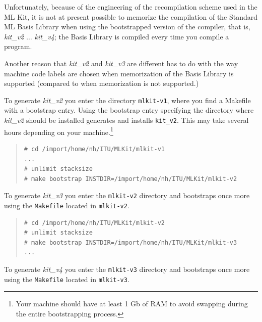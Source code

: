 \documentclass[12pt]{book}
\begin{document}
Unfortunately, because of the engineering of the recompilation scheme
used in the ML Kit, it is not at present possible to memorize 
\label{memorize_bootstrap.sec}
the compilation of the Standard ML Basis Library
 when using the
bootstrapped version of the compiler, that is, \emph{kit\_v2} $\ldots$
\emph{kit\_v4}; the Basis Library is compiled every time you compile a
program.

Another reason that \emph{kit\_v2} and \emph{kit\_v3} are different
has to do with the way machine code labels are chosen when
memorization of the Basis Library is supported (compared to when
memorization is not supported.)

To generate \emph{kit\_v2} you enter the directory \texttt{mlkit-v1},
where you find a Makefile with a bootstrap entry. Using the bootstrap
entry specifying the directory where \emph{kit\_v2} should be
installed generates and installs \texttt{kit\_v2}. This may take
several hours depending on your machine.\footnote{Your machine should
  have at least 1 Gb of RAM to avoid swapping during the entire
  bootstrapping process.}

\begin{small}
\begin{quote}
\begin{verbatim}
# cd /import/home/nh/ITU/MLKit/mlkit-v1
...
# unlimit stacksize
# make bootstrap INSTDIR=/import/home/nh/ITU/MLKit/mlkit-v2
\end{verbatim}
\end{quote}
\end{small}

To generate \emph{kit\_v3}  you enter
the \texttt{mlkit-v2} directory and bootstraps once more using the
{\tt Makefile} located in \texttt{mlkit-v2}.

\begin{small}
\begin{quote}
\begin{verbatim}
# cd /import/home/nh/ITU/MLKit/mlkit-v2
# unlimit stacksize
# make bootstrap INSTDIR=/import/home/nh/ITU/MLKit/mlkit-v3
...
\end{verbatim}
\end{quote}
\end{small}

To generate \emph{kit\_v4}  you enter
the \texttt{mlkit-v3} directory and bootstraps once more using the
{\tt Makefile} located in \texttt{mlkit-v3}.
\end{document}
